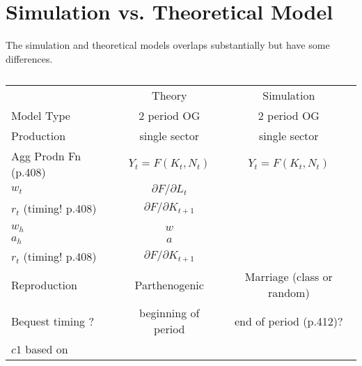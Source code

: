 \documentclass{article}
\begin{document}
\section{Simulation vs. Theoretical Model}

The simulation and theoretical models overlaps substantially but have some differences.

\begin{table}[htp]
\caption{}
\label{t:differences}
\centering
\begin{tabular}{lcc}\toprule
                        & Theory                        & Simulation
\\
Model Type              & 2 period OG                   & 2 period OG
\\
Production              & single sector                 & single sector
\\ 
Agg Prodn Fn (p.408)    & $Y_{t}=F(K_{t},N_{t})$        & $Y_{t}=F(K_{t},N_{t})$
\\ 
$w_{t}$                 & $\partial F/\partial L_{t}$   &
\\
$r_{t}$ (timing! p.408) & $\partial F/\partial K_{t+1}$ &
\\
\\ 
$w_{h}$                 & $w$                           &
\\ 
$a_{h}$                 & $a$                           &
\\
$r_{t}$ (timing! p.408) & $\partial F/\partial K_{t+1}$ &
\\
Reproduction            & Parthenogenic                 & Marriage (class or random)
\\
Bequest timing ?        & beginning of period           & end of period (p.412)?
\\
$c1$ based on           &                               &
\\
\bottomrule
\end{tabular}
\end{table}


  
  
\end{document}
